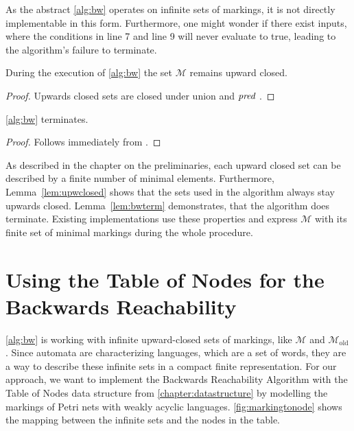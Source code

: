 As the abstract \autoref{alg:bw} operates on infinite sets of markings, it is not directly implementable in this form. Furthermore, one might wonder if there exist inputs, where the conditions in line 7 and line 9 will never evaluate to true, leading to the algorithm's failure to terminate.

\begin{lemma}\label{lem:upwclosed}
During the execution of \autoref{alg:bw} the set $\mathcal{M}$ remains upward closed. 
\end{lemma}
\begin{proof}
Upwards closed sets are closed under union and $\operatorname{\textit{pred}}$ {\cite[Lemma~3.2.16]{esparza_19}}. 
\end{proof}


\begin{lemma}\label{lem:bwterm}
\autoref{alg:bw} terminates. 
\end{lemma}
\begin{proof}
Follows immediately from {\cite[Lemma~3.2.17]{esparza_19}}.
\end{proof}

As described in the chapter on the preliminaries, each upward closed set can be described by a finite number of minimal elements. Furthermore, Lemma~\autoref{lem:upwclosed} shows that the sets used in the algorithm always stay upwards closed. Lemma~\autoref{lem:bwterm} demonstrates, that the algorithm does terminate. Existing implementations use these properties and express $\mathcal{M}$ with its finite set of minimal markings during the whole procedure.


\section{Using the Table of Nodes for the Backwards Reachability}
\autoref{alg:bw} is working with infinite upward-closed sets of markings, like $\mathcal{M}$ and $\mathcal{M}_{\text{old}}$. Since automata are characterizing languages, which are a set of words, they are a way to describe these infinite sets in a compact finite representation. For our approach, we want to implement the Backwards Reachability Algorithm with the Table of Nodes data structure from \autoref{chapter:datastructure} by modelling the markings of Petri nets with weakly acyclic languages. 
\autoref{fig:markingtonode} shows the mapping between the infinite sets and the nodes in the table. 
\par 

